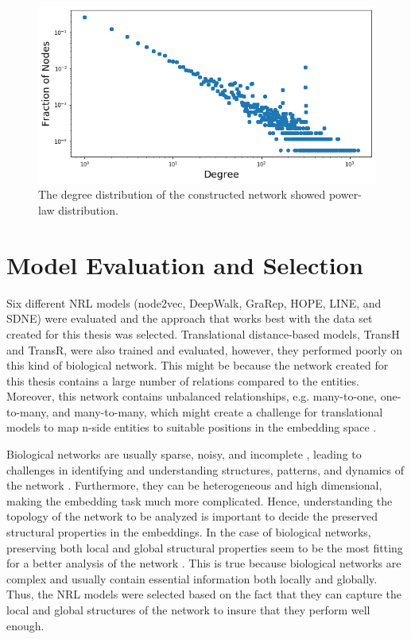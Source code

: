 \begin{figure}[h!]
    \centering
    \includegraphics[scale=0.5]
    {figures/degree_distribution.png}
    \caption[Degree distribution of network]{\label{fig:degree_distribution}The degree distribution of the constructed network showed power-law distribution.}
\end{figure}

\section{Model Evaluation and Selection}
Six different \ac{NRL} models (node2vec, DeepWalk, \ac{GraRep}, \ac{HOPE}, \ac{LINE}, and \ac{SDNE}) were evaluated and the approach that works best with the data set created for this thesis was selected. Translational distance-based models, TransH and TransR, were also trained and evaluated, however, they performed poorly on this kind of biological network. This might be because the network created for this thesis contains a large number of relations compared to the entities. Moreover, this network contains unbalanced relationships, e.g. many-to-one, one-to-many, and many-to-many, which might create a challenge for translational models to map n-side entities to suitable positions in the embedding space \cite{liang_predicting_2019}.

Biological networks are usually sparse, noisy, and incomplete \cite{nickel_review_2016}, leading to challenges in identifying and understanding structures, patterns, and dynamics of the network \cite{wang_unsupervised_2016}. Furthermore, they can be heterogeneous and high dimensional, making the embedding task much more complicated. Hence, understanding the topology of the network to be analyzed is important to decide the preserved structural properties in the embeddings. In the case of biological networks, preserving both local and global structural properties seem to be the most fitting for a better analysis of the network \cite{su_network_2018}. This is true because biological networks are complex and usually contain essential information both locally and globally. Thus, the \ac{NRL} models were selected based on the fact that they can capture the local and global structures of the network to insure that they perform well enough.

